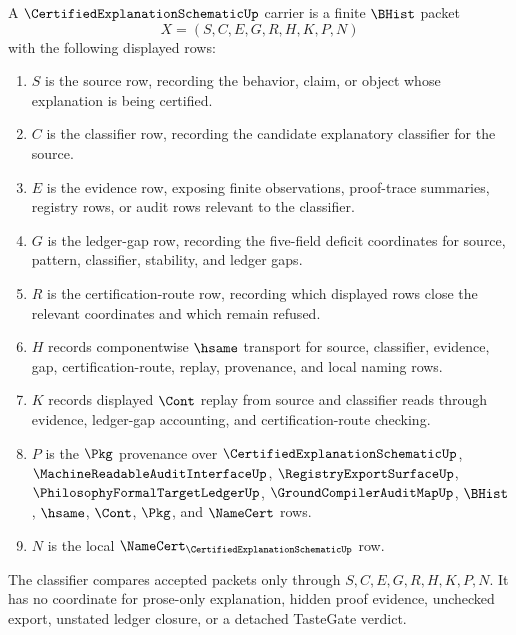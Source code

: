 \begin{definition}
\label{def:certified-explanation-schematic-carrier}
A $\CertifiedExplanationSchematicUp$ carrier is a finite $\BHist$ packet
$$
X=(S,C,E,G,R,H,K,P,N)
$$
with the following displayed rows:
\begin{enumerate}
\item $S$ is the source row, recording the behavior, claim, or object whose explanation is being certified.
\item $C$ is the classifier row, recording the candidate explanatory classifier for the source.
\item $E$ is the evidence row, exposing finite observations, proof-trace summaries, registry rows, or audit rows relevant to the classifier.
\item $G$ is the ledger-gap row, recording the five-field deficit coordinates for source, pattern, classifier, stability, and ledger gaps.
\item $R$ is the certification-route row, recording which displayed rows close the relevant coordinates and which remain refused.
\item $H$ records componentwise $\hsame$ transport for source, classifier, evidence, gap, certification-route, replay, provenance, and local naming rows.
\item $K$ records displayed $\Cont$ replay from source and classifier reads through evidence, ledger-gap accounting, and certification-route checking.
\item $P$ is the $\Pkg$ provenance over $\CertifiedExplanationSchematicUp$, $\MachineReadableAuditInterfaceUp$, $\RegistryExportSurfaceUp$, $\PhilosophyFormalTargetLedgerUp$, $\GroundCompilerAuditMapUp$, $\BHist$, $\hsame$, $\Cont$, $\Pkg$, and $\NameCert$ rows.
\item $N$ is the local $\NameCert_{\CertifiedExplanationSchematicUp}$ row.
\end{enumerate}
The classifier compares accepted packets only through $S,C,E,G,R,H,K,P,N$. It has no coordinate for prose-only explanation, hidden proof evidence, unchecked export, unstated ledger closure, or a detached TasteGate verdict.
\end{definition}

